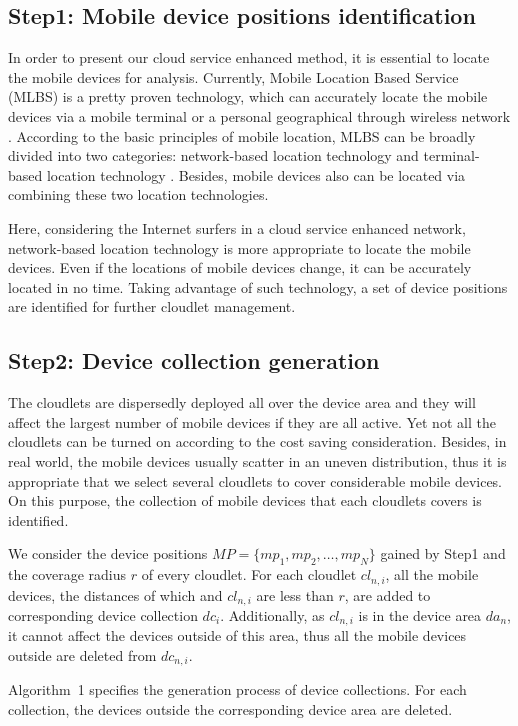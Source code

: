 \documentclass{llncs}
\begin{document}
\subsection{Step1: Mobile device positions identification}
%
In order to present our cloud service enhanced method, it is essential to locate the mobile devices for analysis. Currently, Mobile Location Based Service (MLBS) is a pretty proven technology, which can accurately locate the mobile devices via a mobile terminal or a personal geographical through wireless network \cite{wang:wang,constandache}. According to the basic principles of mobile location, MLBS can be broadly divided into two categories: network-based location technology and terminal-based location technology \cite{lee:wicke}. Besides, mobile devices also can be located via combining these two location technologies.

Here, considering the Internet surfers in a cloud service enhanced network, network-based location technology is more appropriate to locate the mobile devices. Even if the locations of mobile devices change, it can be accurately located in no time. Taking advantage of such technology, a set of device positions are identified for further cloudlet management.
%
\subsection{Step2: Device collection generation}
%
The cloudlets are dispersedly deployed all over the device area and they will affect the largest number of mobile devices if they are all active. Yet not all the cloudlets can be turned on according to the cost saving consideration. Besides, in real world, the mobile devices usually scatter in an uneven distribution, thus it is appropriate that we select several cloudlets to cover considerable mobile devices. On this purpose, the collection of mobile devices that each cloudlets covers is identified.

We consider the device positions $MP = \{mp_1, mp_2,\dots, mp_N\}$ gained by Step1 and the coverage radius $r$ of every cloudlet. For each cloudlet $cl_{n,i}$, all the mobile devices, the distances of which and $cl_{n,i}$ are less than $r$, are added to corresponding device collection $dc_i$. Additionally, as $cl_{n,i}$ is in the device area $da_n$, it cannot affect the devices outside of this area, thus all the mobile devices outside are deleted from $dc_{n,i}$.

Algorithm~1 specifies the generation process of device collections. For each collection, the devices outside the corresponding device area are deleted.
\end{document}
